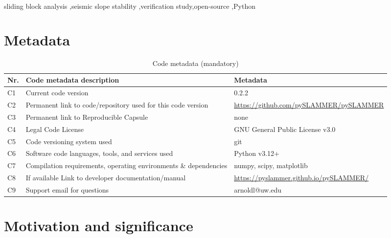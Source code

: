 \documentclass[preprint,review,12pt]{elsarticle}
\begin{document}
\begin{frontmatter}
\begin{keyword}
sliding block analysis \sep seismic slope stability \sep verification study\sep open-source \sep Python 


\end{keyword}

\end{frontmatter}


\section*{Metadata}

\begin{table}[!h]
\begin{tabular}{|l|p{6.5cm}|p{6.5cm}|}
\hline
\textbf{Nr.} & \textbf{Code metadata description} & \textbf{Metadata} \\
\hline
C1 & Current code version & 0.2.2 \\
\hline
C2 & Permanent link to code/repository used for this code version & \url{https://github.com/pySLAMMER/pySLAMMER} \\
\hline
C3  & Permanent link to Reproducible Capsule & none\\
\hline
C4 & Legal Code License   & GNU General Public License v3.0 \\
\hline
C5 & Code versioning system used & git \\
\hline
C6 & Software code languages, tools, and services used & Python v3.12+ \\
\hline
C7 & Compilation requirements, operating environments \& dependencies & numpy, scipy, matplotlib\\
\hline
C8 & If available Link to developer documentation/manual & \url{https://pyslammer.github.io/pySLAMMER/} \\
\hline
C9 & Support email for questions & arnoldl@uw.edu\\
\hline
\end{tabular}
\caption{Code metadata (mandatory)}
\label{codeMetadata} 
\end{table}


\section{Motivation and significance}
\end{document}
